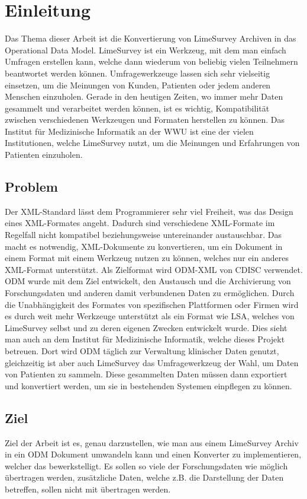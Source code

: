 \chapter{Einleitung}
\label{ch:einleitung}

Das Thema dieser Arbeit ist die Konvertierung von LimeSurvey Archiven in das Operational Data Model.
LimeSurvey ist ein Werkzeug, mit dem man einfach Umfragen erstellen kann, welche dann wiederum von beliebig vielen Teilnehmern beantwortet werden können.
Umfragewerkzeuge lassen sich sehr vielseitig einsetzen, um die Meinungen von Kunden, Patienten oder jedem anderen Menschen einzuholen.
Gerade in den heutigen Zeiten, wo immer mehr Daten gesammelt und verarbeitet werden können, ist es wichtig, Kompatibilität zwischen verschiedenen Werkzeugen und Formaten herstellen zu können.
Das Institut für Medizinische Informatik an der WWU ist eine der vielen Institutionen, welche LimeSurvey nutzt, um die Meinungen und Erfahrungen von Patienten einzuholen.

\section{Problem}
Der XML-Standard lässt dem Programmierer sehr viel Freiheit, was das Design eines XML-Formates angeht. Dadurch sind verschiedene XML-Formate im Regelfall nicht kompatibel beziehungsweise untereinander austauschbar.
Das macht es notwendig, XML-Dokumente zu konvertieren, um ein Dokument in einem Format mit einem Werkzeug nutzen zu können, welches nur ein anderes XML-Format unterstützt.
Als Zielformat wird ODM-XML von CDISC verwendet.
ODM wurde mit dem Ziel entwickelt, den Austausch und die Archivierung von Forschungsdaten und anderen damit verbundenen Daten zu ermöglichen.
Durch die Unabhängigkeit des Formates von spezifischen Plattformen oder Firmen wird es durch weit mehr Werkzeuge unterstützt als ein Format wie LSA, welches von LimeSurvey selbst und zu deren eigenen Zwecken entwickelt wurde.
Dies sieht man auch an dem Institut für Medizinische Informatik, welche dieses Projekt betreuen.
Dort wird ODM täglich zur Verwaltung klinischer Daten genutzt, gleichzeitig ist aber auch LimeSurvey das Umfragewerkzeug der Wahl, um Daten von Patienten zu sammeln.
Diese gesammelten Daten müssen dann exportiert und konvertiert werden, um sie in bestehenden Systemen einpflegen zu können.

\section{Ziel}
Ziel der Arbeit ist es, genau darzustellen, wie man aus einem LimeSurvey Archiv in ein ODM Dokument umwandeln kann und einen Konverter zu implementieren, welcher das bewerkstelligt.
Es sollen so viele der Forschungsdaten wie möglich übertragen werden, zusätzliche Daten, welche z.B. die Darstellung der Daten betreffen, sollen nicht mit übertragen werden.

